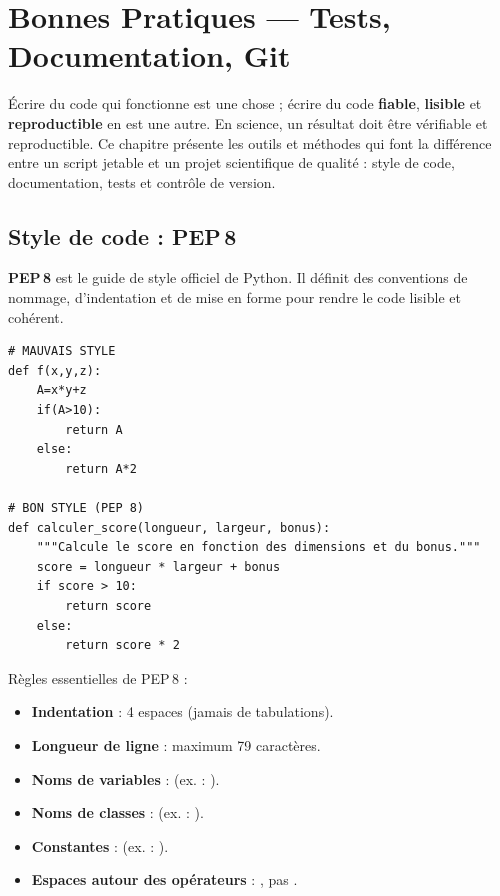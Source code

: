 \chapter{Bonnes Pratiques --- Tests, Documentation, Git}
\label{ch:bonnes_pratiques}

\begin{intuition}
\'Ecrire du code qui fonctionne est une chose ; \'ecrire du code \textbf{fiable},
\textbf{lisible} et \textbf{reproductible} en est une autre. En science, un r\'esultat
doit \^etre v\'erifiable et reproductible. Ce chapitre pr\'esente les outils et
m\'ethodes qui font la diff\'erence entre un script jetable et un projet scientifique
de qualit\'e : style de code, documentation, tests et contr\^ole de version.
\end{intuition}

\section{Style de code : PEP\,8}

\begin{definition}[PEP\,8]
\textbf{PEP\,8} est le guide de style officiel de Python. Il d\'efinit des conventions
de nommage, d'indentation et de mise en forme pour rendre le code lisible et
coh\'erent.
\end{definition}

\begin{codeblock}[title=\textbf{Python}]
\begin{verbatim}
# MAUVAIS STYLE
def f(x,y,z):
    A=x*y+z
    if(A>10):
        return A
    else:
        return A*2

# BON STYLE (PEP 8)
def calculer_score(longueur, largeur, bonus):
    """Calcule le score en fonction des dimensions et du bonus."""
    score = longueur * largeur + bonus
    if score > 10:
        return score
    else:
        return score * 2
\end{verbatim}
\end{codeblock}

\begin{bonnepratique}
R\`egles essentielles de PEP\,8 :
\begin{itemize}
  \item \textbf{Indentation} : 4 espaces (jamais de tabulations).
  \item \textbf{Longueur de ligne} : maximum 79 caract\`eres.
  \item \textbf{Noms de variables} :  (ex. : ).
  \item \textbf{Noms de classes} :  (ex. : ).
  \item \textbf{Constantes} :  (ex. : ).
  \item \textbf{Espaces autour des op\'erateurs} : , pas .
\end{itemize}
\end{bonnepratique}

